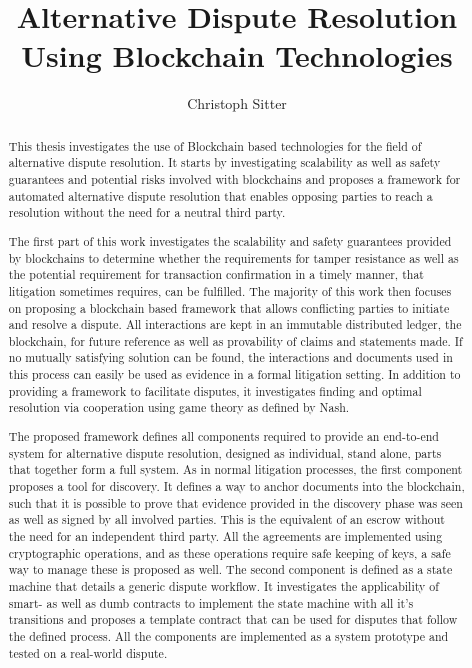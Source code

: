 \documentclass[12pt,msc,a4paper,oneside]{ucl_thesis}
\title{Alternative Dispute Resolution Using Blockchain Technologies}
\author{Christoph Sitter 
}
\begin{document}
\maketitle
\makedeclaration


\begin{abstract}
    This thesis investigates the use of Blockchain based technologies for the field of alternative dispute resolution. It starts by investigating scalability as well as safety guarantees and potential risks involved with blockchains and proposes a framework for automated alternative dispute resolution that enables opposing parties to reach a resolution without the need for a neutral third party. 

    The first part of this work investigates the scalability and safety guarantees provided by blockchains to determine whether the requirements for tamper resistance as well as the potential requirement for transaction confirmation in a timely manner, that litigation sometimes requires, can be fulfilled. The majority of this work then focuses on proposing a blockchain based framework that allows conflicting parties to initiate and resolve a dispute. All interactions are kept in an immutable distributed ledger, the blockchain, for future reference as well as provability of claims and statements made. If no mutually satisfying solution can be found, the interactions and documents used in this process can easily be used as evidence in a formal litigation setting. In addition to providing a framework to facilitate disputes, it investigates finding and optimal resolution via cooperation using game theory as defined by Nash.

    The proposed framework defines all components required to provide an end-to-end system for alternative dispute resolution, designed as individual, stand alone, parts that together form a full system. As in normal litigation processes, the first component proposes a tool for discovery. It defines a way to anchor documents into the blockchain, such that it is possible to prove that evidence provided in the discovery phase was seen as well as signed by all involved parties. This is the equivalent of an escrow without the need for an independent third party. All the agreements are implemented using cryptographic operations, and as these operations require safe keeping of keys, a safe way to manage these is proposed as well. 
    The second component is defined as a state machine that details a generic dispute workflow. It investigates the applicability of smart- as well as dumb contracts to implement the state machine with all it's transitions and proposes a template contract that can be used for disputes that follow the defined process. All the components are implemented as a system prototype and tested on a real-world dispute.

\end{abstract}
\end{document}
